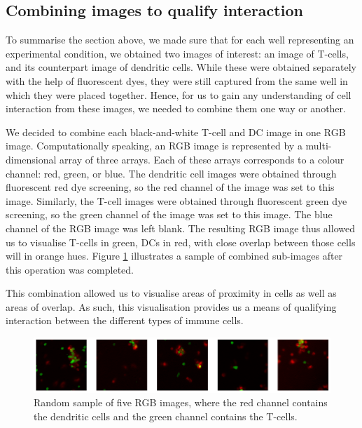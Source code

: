 \subsection{Combining images to qualify interaction} \label{subsec:combining}

To summarise the section above, we made sure that for each well representing an experimental condition, we obtained two images of interest: an image of T-cells, and its counterpart image of dendritic cells. While these were obtained separately with the help of fluorescent dyes, they were still captured from the same well in which they were placed together. Hence, for us to gain any understanding of cell interaction from these images, we needed to combine them one way or another.

We decided to combine each black-and-white T-cell and DC image in one RGB image. Computationally speaking, an RGB image is represented by a multi-dimensional array of three arrays. Each of these arrays corresponds to a colour channel: red, green, or blue. The dendritic cell images were obtained through fluorescent red dye screening, so the red channel of the image was set to this image. Similarly, the T-cell images were obtained through fluorescent green dye screening, so the green channel of the image was set to this image. The blue channel of the RGB image was left blank. The resulting RGB image thus allowed us to visualise T-cells in green, DCs in red, with close overlap between those cells will in orange hues. Figure \ref{fig:combined} illustrates a sample of combined sub-images after this operation was completed.

This combination allowed us to visualise areas of proximity in cells as well as areas of overlap. As such, this visualisation provides us a means of qualifying interaction between the different types of immune cells.

\begin{figure}[h]
    \centering
    \includegraphics[width=\textwidth]{dissertation/figures/combined_cells.png}
    \caption{Random sample of five RGB images, where the red channel contains the dendritic cells and the green channel contains the T-cells.}
    \label{fig:combined}
\end{figure}

